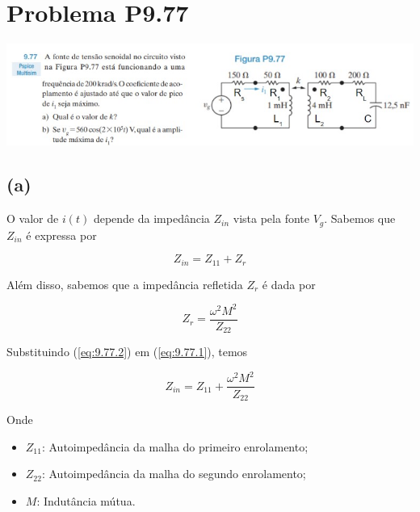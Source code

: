 \documentclass[12pt]{scrartcl}
\begin{document}

    \section*{Problema P9.77}

    \begin{center}
        \includegraphics[scale=1.0]{P9.77.jpg}
    \end{center}

    \subsection*{(a)}

    O valor de \(i(t)\) depende da impedância \(Z_{in}\) vista pela fonte \(V_{g}\).
    Sabemos que \(Z_{in}\) é expressa por

    \begin{equation}\label{eq:9.77.1}
        Z_{in} = Z_{11} + Z_{r}
    \end{equation}

    Além disso, sabemos que a impedância refletida \(Z_{r}\) é dada por

    \begin{equation}\label{eq:9.77.2}
        Z_{r} = \frac{\omega^2M^2}{Z_{22}}
    \end{equation}

    Substituindo (\ref{eq:9.77.2}) em (\ref{eq:9.77.1}), temos

    \begin{equation}\label{eq:9.77.3}
        Z_{in} = Z_{11} + \frac{\omega^2M^2}{Z_{22}}
    \end{equation}

    Onde
    \begin{itemize}
        \item \(Z_{11}\): Autoimpedância da malha do primeiro enrolamento;
        \item \(Z_{22}\): Autoimpedância da malha do segundo enrolamento;
        \item \(M\): Indutância mútua.
    \end{itemize}
\end{document}
